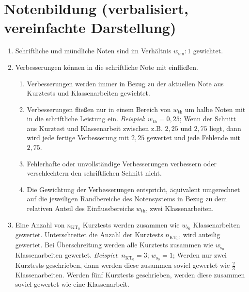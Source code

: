 \section{Notenbildung (verbalisiert, vereinfachte Darstellung)}
{\normalsize
\begin{enumerate}[label=\textbf{\arabic*)}]
	\item Schriftliche und mündliche Noten sind im Verhältnis $w_{\mathrm{sm}} : 1$ gewichtet.
	\item Verbesserungen können in die schriftliche Note mit einfließen.
	\begin{enumerate}[label=\textbf{(\alph*)}]
		\item Verbesserungen werden immer in Bezug zu der aktuellen Note aus Kurztests und Klassenarbeiten gewichtet.
		\item Verbesserungen fließen nur in einem Bereich von $w_{\mathrm{th}}$ um halbe Noten mit in die schriftliche Leistung ein. \textit{Beispiel}: $w_{\mathrm{th}}=0{,}25$; Wenn der Schnitt aus Kurztest und Klassenarbeit zwischen z.B. $2{,}25$ und $2{,}75$ liegt, dann wird jede fertige Verbesserung mit $2{,}25$ gewertet und jede Fehlende mit $2{,}75$.
		\item Fehlerhafte oder unvollständige Verbesserungen verbessern oder verschlechtern den schriftlichen Schnitt nicht.
		\item Die Gewichtung der Verbesserungen entspricht, äquivalent umgerechnet auf die jeweiligen Randbereiche des Notensystems in Bezug zu dem relativen Anteil des Einflussbereichs $w_{\mathrm{th}}$, zwei Klassenarbeiten.
	\end{enumerate}
	\item Eine Anzahl von $n_{\mathrm{KT}_0}$ Kurztests werden zusammen wie $w_{\mathrm{s}_0}$ Klassenarbeiten gewertet. Unterschreitet die Anzahl der Kurztests $n_{\mathrm{KT}_0}$, wird anteilig gewertet. Bei Überschreitung werden alle Kurztests zusammen wie  $w_{\mathrm{s}_0}$ Klassenarbeiten gewertet. \textit{Beispiel}:  $n_{\mathrm{KT}_0} = 3$; $w_{\mathrm{s}_0}=1$; Werden nur zwei Kurztests geschrieben, dann werden diese zusammen soviel gewertet wie $\frac{2}{3}$ Klassenarbeiten. Werden fünf Kurztests geschrieben, werden diese zusammen soviel gewertet wie eine Klassenarbeit.
\end{enumerate}
}

